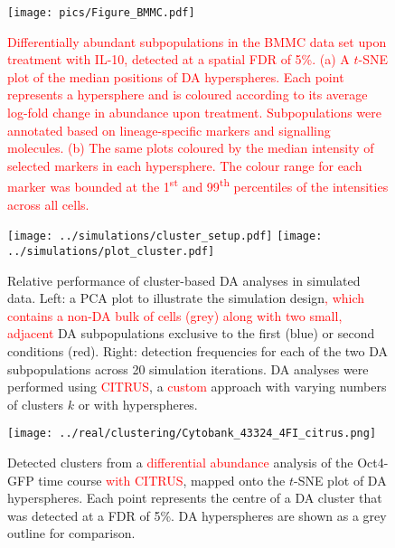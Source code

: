 \documentclass{article}
\newcommand\revised[1]{\textcolor{red}{#1}}
\begin{document}
\begin{figure}[p]
    \begin{center}
        \texttt{[image: pics/Figure\_BMMC.pdf]}
    \end{center}
    \caption{\revised{
            Differentially abundant subpopulations in the BMMC data set upon treatment with IL-10, detected at a spatial FDR of 5\%.
            (a) A $t$-SNE plot of the median positions of DA hyperspheres. 
            Each point represents a hypersphere and is coloured according to its average log-fold change in abundance upon treatment.
            Subpopulations were annotated based on lineage-specific markers and signalling molecules.
            (b) The same plots coloured by the median intensity of selected markers in each hypersphere.
            The colour range for each marker was bounded at the 1\textsuperscript{st} and 99\textsuperscript{th} percentiles of the intensities across all cells.
        }
    }
    \label{fig:bmmc}
\end{figure}


\begin{figure}[p]
\begin{center}
\texttt{[image: ../simulations/cluster\_setup.pdf]}
\texttt{[image: ../simulations/plot\_cluster.pdf]}
\end{center}
\caption{Relative performance of cluster-based DA analyses in simulated data.
    Left: a PCA plot to illustrate the simulation design\revised{, which contains a non-DA bulk of cells (grey) along with two small, adjacent} DA subpopulations exclusive to the first (blue) or second conditions (red).
    Right: detection frequencies for each of the two DA subpopulations across 20 simulation iterations.
    DA analyses were performed using \revised{CITRUS}, a \revised{custom} approach with varying numbers of clusters $k$ or with hyperspheres.
}
\label{fig:clustersim}
\end{figure}

\begin{figure}[p]
\begin{center}
\texttt{[image: ../real/clustering/Cytobank\_43324\_4FI\_citrus.png]}
\end{center}
\caption{Detected clusters from a \revised{differential abundance} analysis of the Oct4-GFP time course \revised{with CITRUS}, mapped onto the $t$-SNE plot of DA hyperspheres.
Each point represents the centre of a DA cluster that was detected at a FDR of 5\%.
DA hyperspheres are shown as a grey outline for comparison.
}
\end{figure}
\end{document}
